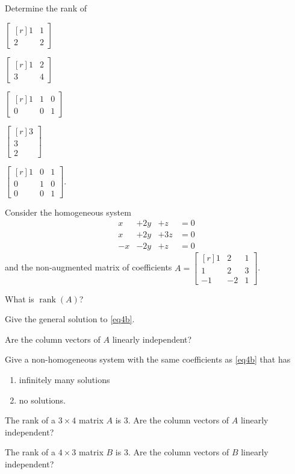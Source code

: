 \documentclass{problemset}
\DeclareMathOperator{\Rank}{rank}
\newcommand{\mat}[1]{\begin{bmatrix*}[r]#1\end{bmatrix*}}
\begin{document}
	\question
	\begin{parts}
		\item Determine the rank of
		\begin{enumerate*}
			\item $\mat{1&1\\2&2}$
			\item $\mat{1&2\\3&4}$
			\item $\mat{1&1&0\\0&0&1}$
			\item $\mat{3\\3\\2}$
			\item $\mat{1&0&1\\0&1&0\\0&0&1}$.
		\end{enumerate*}
	\end{parts}
	
	\question
	Consider the homogeneous system 
		\begin{equation}\label{eq4b}
			\begin{array}{llll}
				x&+2y&+z &= 0\\
				x&+2y&+3z &= 0\\
				-x&-2y&+z &= 0
			\end{array}
		\end{equation}
	and the non-augmented matrix of coefficients $A=\mat{1&2&1\\1&2&3\\-1&-2&1}$.
	\begin{parts}
		\item What is $\Rank(A)$?
		\item Give the general solution to \eqref{eq4b}.
		\item Are the column vectors of $A$ linearly independent?
		\item Give a non-homogeneous system with the same coefficients as \eqref{eq4b} that has
			\begin{enumerate}
				\item infinitely many solutions
				\item no solutions.
			\end{enumerate}
	\end{parts}

	\question
	\begin{parts}
		\item The rank of a $3\times 4$ matrix $A$ is $3$.  Are the column vectors of $A$ linearly independent?
		\item The rank of a $4\times 3$ matrix $B$ is $3$.  Are the column vectors of $B$ linearly independent?
	\end{parts}
\end{document}
